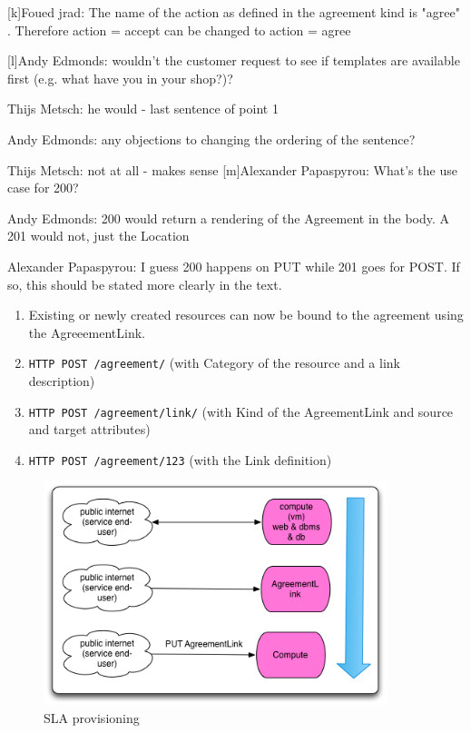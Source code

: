 \documentclass[12pt]{article}  %
\begin{document}
{
\color{blue}
[k]Foued jrad:
The name of the action as defined in the agreement kind is "agree" .  Therefore action = accept can be changed to action = agree

[l]Andy Edmonds:
wouldn't the customer request to see if templates are available first (e.g. what have you in your shop?)?

Thijs Metsch:
he would - last sentence of point 1

Andy Edmonds:
any objections to changing the ordering of the sentence?

Thijs Metsch:
not at all - makes sense
[m]Alexander Papaspyrou:
What's the use case for 200?



Andy Edmonds:
200 would return a rendering of the Agreement in the body. A 201 would not, just the Location



Alexander Papaspyrou:
I guess 200 happens on PUT while 201 goes for POST. If so, this should be stated more clearly in the text.
}


\begin{enumerate}
\item Existing or newly created resources can now be bound to the agreement using the AgreeementLink.
\item \verb|HTTP POST /agreement/| (with Category of the resource and a link description)
\item \verb|HTTP POST /agreement/link/| (with Kind of the AgreementLink and source and target attributes)
\item \verb|HTTP POST /agreement/123| (with the Link definition)
\end{enumerate}

\begin{figure}
\centering
\includegraphics[width=10cm]{occi-sla-prov.png}
\caption{\label{slaprovisioning} SLA provisioning}
\end{figure}
\end{document}
